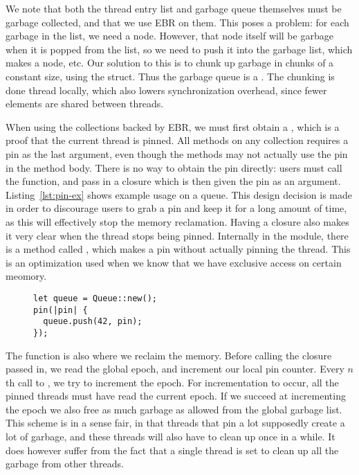 \documentclass[b5paper]{report}
\begin{document}
We note that both the thread entry list and garbage queue themselves must be garbage
collected, and that we use EBR on them. This poses a problem: for each
garbage in the list, we need a node. However, that node itself will be garbage
when it is popped from the list, so we need to push it into the garbage list,
which makes a node, etc. Our solution to this is to chunk up garbage in chunks
of a constant size, using the  struct. Thus the garbage queue is a
. The chunking is done thread locally, which also
lowers synchronization overhead, since fewer elements are shared between threads.

When using the collections backed by EBR, we must first obtain a ,
which is a proof that the current thread is pinned.  All methods on any
collection requires a pin as the last argument, even though the methods may not
actually use the pin in the method body. There is no way to obtain the pin
directly: users must call the  function, and pass in a closure which
is then given the pin as an argument. Listing~\ref{lst:pin-ex} shows example
usage on a queue. This design decision is made in order to discourage users to
grab a pin and keep it for a long amount of time, as this will effectively stop
the memory reclamation. Having a closure also makes it very clear when the
thread stops being pinned. Internally in the  module, there is a
method called , which makes a pin without actually pinning the
thread. This is an optimization used when we know that we have exclusive access
on certain meomory.

\begin{figure}[ht!]
\begin{lstlisting}[caption=Example usage of the \code{pin} fucntion,
label=lst:pin-ex,numbers=none]
let queue = Queue::new();
pin(|pin| {
  queue.push(42, pin);
});
\end{lstlisting}
\end{figure}

The  function is also where we reclaim the memory.  Before calling the
closure passed in, we read the global epoch, and increment our local pin
counter. Every $n$th call to , we try to increment the epoch. For
incrementation to occur, all the pinned threads must have read the current
epoch. If we succeed at incrementing the epoch we also free as much garbage as
allowed from the global garbage list. This scheme is in a sense fair, in that
threads that pin a lot supposedly create a lot of garbage, and these threads
will also have to clean up once in a while. It does however suffer from the fact
that a single thread is set to clean up all the garbage from other threads.
\end{document}
